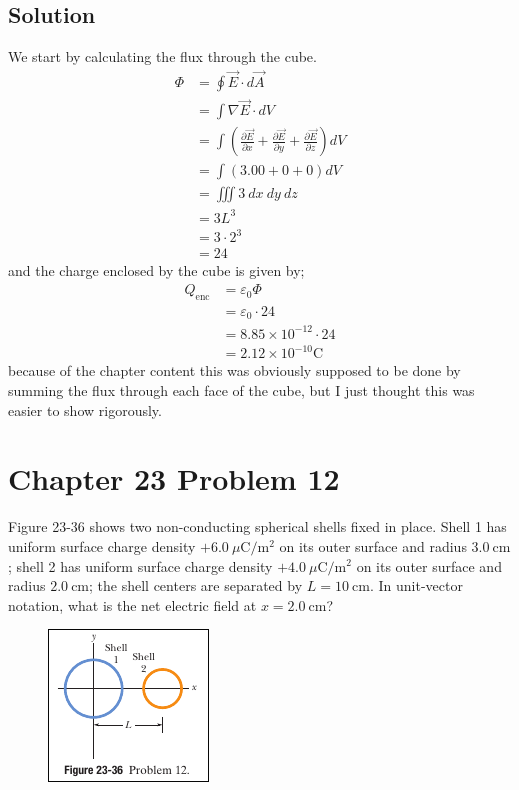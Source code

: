 \documentclass{article}
\newcommand{\m}{\text{m}}
\newcommand{\centi}{\text{c}}
\newcommand{\C}{\text{C}}
\begin{document}
\subsection*{Solution}
We start by calculating the flux through the cube.
\begin{align*}
    \Phi &= \oint \vec{E} \cdot d\vec{A} \\
    &= \int \nabla \vec{E} \cdot dV \\
    &= \int \left( \frac{\partial \vec{E}}{\partial x} + \frac{\partial \vec{E}}{\partial y} + \frac{\partial \vec{E}}{\partial z} \right) dV \\ 
    &= \int \left( 3.00 + 0 + 0 \right) dV \\
    &= \iiint 3\ dx\ dy\ dz \\
    &= 3L^3 \\
    &= 3 \cdot 2^3 \\
    &= 24
\end{align*}
and the charge enclosed by the cube is given by;
\begin{align*}
    Q_\text{enc} &= \varepsilon_0 \Phi \\
    &= \varepsilon_0 \cdot 24 \\
    &= 8.85 \times 10^{-12} \cdot 24 \\
    &= \boxed{2.12 \times 10^{-10} \C}
\end{align*}
because of the chapter content this was obviously supposed to be done by summing the flux through each face of the cube, but I just thought this was easier to show rigorously.

\section*{Chapter 23 Problem 12}
Figure 23-36 shows two non-conducting spherical shells fixed in place. Shell 1 has uniform surface charge density $+6.0\ \mu\C/\m^2$ on its outer surface and radius $3.0\ \centi \m$; shell 2 has uniform surface charge density $+4.0\ \mu\C/\m^2$ on its outer surface and radius $2.0\ \centi \m$; the shell centers are separated by $L = 10\ \centi \m$. In unit-vector notation, what is the net electric field at $x = 2.0\ \centi \m$?

\begin{figure}[ht]
    \centering
    \includegraphics[scale=0.75]{image-4.png}
\end{figure}
\end{document}
